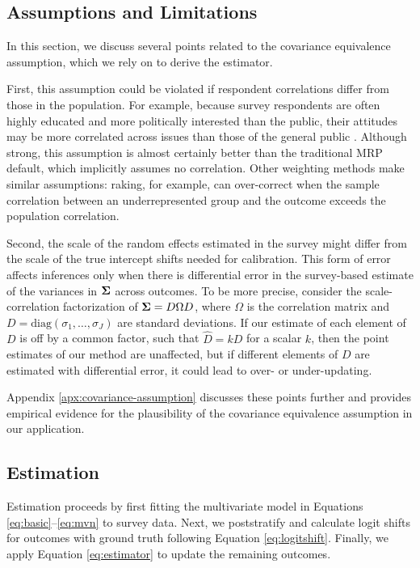\subsection{Assumptions and Limitations}
\label{sec:assms}

In this section, we discuss several points related to the covariance equivalence assumption, which we rely on to derive the estimator. 

First, this assumption could be violated if respondent correlations differ from those in the population. 
For example, because survey respondents are often highly educated and more politically interested than the public, their attitudes may be more correlated across issues than those of the general public \citep{Marble2022a,Freeder2018,H:2023}.
Although strong, this assumption is almost certainly better than the traditional MRP default, which implicitly assumes no correlation.
Other weighting methods make similar assumptions: raking, for example, can over-correct when the sample correlation between an underrepresented group and the outcome exceeds the population correlation. 



Second, the scale of the random effects estimated in the survey might differ from the scale of the true intercept shifts needed for calibration.
This form of error affects inferences only when there is differential error in the survey-based estimate of the variances in $\mathbf{\Sigma}$ across outcomes.
To be more precise, consider the scale-correlation factorization of $\mathbf{\Sigma} = D \Omega D$, where $\Omega$ is the correlation matrix and $D = \text{diag}(\sigma_1, \dots, \sigma_J)$ are standard deviations. If our estimate of each element of $D$ is off by a common factor, such that $\hat{D} = k D$ for a scalar $k$, then the point estimates of our method are unaffected, but if different elements of $D$ are estimated with differential error, it could lead to over- or under-updating. 

Appendix \ref{apx:covariance-assumption} discusses these points further and provides empirical evidence for the plausibility of the covariance equivalence assumption in our application. 



\subsection{Estimation}
\label{sec:estimation}
Estimation proceeds by first fitting the multivariate model in Equations \eqref{eq:basic}--\eqref{eq:mvn} to survey data. 
Next, we poststratify and calculate logit shifts for outcomes with ground truth following Equation \eqref{eq:logitshift}. Finally, we apply Equation \eqref{eq:estimator} to update the remaining outcomes.

